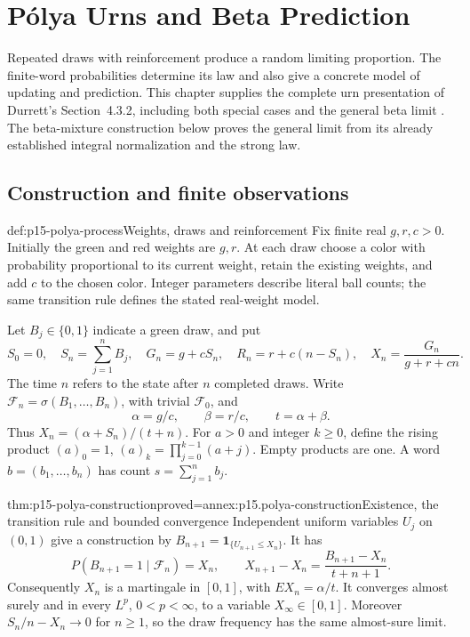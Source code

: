 \chapter{P\'olya Urns and Beta Prediction}
\label{sec:p15-polya-urns}

Repeated draws with reinforcement produce a random limiting proportion.
The finite-word probabilities determine its law and also give a concrete
model of updating and prediction. This chapter supplies the complete
urn presentation of Durrett's Section~4.3.2, including both special
cases and the general beta limit
\cite[pp.~226--227]{DurrettPTEAuthor2019}.
The beta-mixture construction below proves the general limit from its
already established integral normalization and the strong law.

\section{Construction and finite observations}

\begin{hbdefinition}{def:p15-polya-process}{Weights, draws and reinforcement}
Fix finite real \(g,r,c>0\). Initially the green and red weights are
\(g,r\). At each draw choose a color with probability proportional
to its current weight, retain the existing weights, and add \(c\)
to the chosen color. Integer parameters describe literal ball counts;
the same transition rule defines the stated real-weight model.

Let \(B_j\in\{0,1\}\) indicate a green draw, and put
\[
 S_0=0,\quad S_n=\sum_{j=1}^nB_j,\quad
 G_n=g+cS_n,\quad R_n=r+c(n-S_n),\quad
 X_n=\frac{G_n}{g+r+cn}.
\]
The time \(n\) refers to the state after \(n\) completed draws.
Write \(\mathcal F_n=\sigma(B_1,\ldots,B_n)\), with trivial
\(\mathcal F_0\), and
\[
                \alpha=g/c,\qquad\beta=r/c,\qquad t=\alpha+\beta.
\]
Thus \(X_n=(\alpha+S_n)/(t+n)\).
For \(a>0\) and integer \(k\geq0\), define the rising product
\((a)_0=1\), \((a)_k=\prod_{j=0}^{k-1}(a+j)\).
Empty products are one. A word \(b=(b_1,\ldots,b_n)\) has count
\(s=\sum_{j=1}^nb_j\).
\end{hbdefinition}

\begin{hbtheorem}{thm:p15-polya-construction}{proved=annex:p15.polya-construction}{Existence, the transition rule and bounded convergence}
Independent uniform variables \(U_j\) on \((0,1)\) give a construction
by \(B_{n+1}=\mathbf1_{\{U_{n+1}\leq X_n\}}\).
It has
\[
 P(B_{n+1}=1\mid\mathcal F_n)=X_n,\qquad
 X_{n+1}-X_n=\frac{B_{n+1}-X_n}{t+n+1}.
\]
Consequently \(X_n\) is a martingale in \([0,1]\), with
\(EX_n=\alpha/t\). It converges almost surely and in every
\(L^p\), \(0<p<\infty\), to a variable \(X_\infty\in[0,1]\).
Moreover \(S_n/n-X_n\to0\) for \(n\geq1\), so the draw frequency
has the same almost-sure limit.
\end{hbtheorem}

